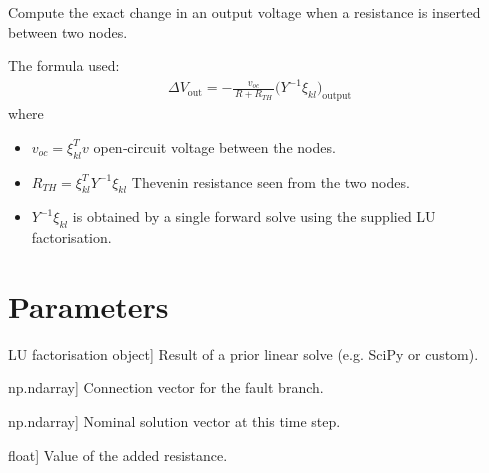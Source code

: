 \documentclass[letterpaper,10pt,english]{sphinxmanual}
\begin{document}
\begin{fulllineitems}
\label{\detokenize{large_change_sensitivity:compute_large_change}}
\pysigstartsignatures
\pysiglinewithargsret
{}
{\sphinxparamcomma {}\sphinxparamcomma {}\sphinxparamcomma {}\sphinxparamcomma {}}
{}
\pysigstopsignatures
\sphinxAtStartPar
Compute the exact change in an output voltage when a resistance 
is inserted between two nodes.

\sphinxAtStartPar
The formula used:
\begin{equation*}
\begin{split}\Delta V_{\text{out}}
  = -\frac{v_{oc}}{\,R + R_{TH}\,}
    \bigl(Y^{-1} \xi_{kl}\bigr)_{\text{output}}\end{split}
\end{equation*}
\sphinxAtStartPar
where
\begin{itemize}
\item {} 
\sphinxAtStartPar
\(v_{oc} = \xi_{kl}^{T} v\) \textendash{} open‑circuit voltage between the nodes.

\item {} 
\sphinxAtStartPar
\(R_{TH} = \xi_{kl}^{T} Y^{-1} \xi_{kl}\) \textendash{} Thevenin resistance seen from
the two nodes.

\item {} 
\sphinxAtStartPar
\(Y^{-1}\xi_{kl}\) is obtained by a single forward solve using the supplied
LU factorisation.

\end{itemize}


\section{Parameters}
\label{\detokenize{large_change_sensitivity:id1}}\begin{description}
\sphinxlineitem{lu}{[}LU factorisation object{]}
\sphinxAtStartPar
Result of a prior linear solve (e.g. SciPy or custom).

\sphinxlineitem{xi\_kl}{[}np.ndarray{]}
\sphinxAtStartPar
Connection vector for the fault branch.

\sphinxlineitem{v}{[}np.ndarray{]}
\sphinxAtStartPar
Nominal solution vector at this time step.

\sphinxlineitem{R}{[}float{]}
\sphinxAtStartPar
Value of the added resistance.


\end{description}
\end{fulllineitems}
\end{document}

